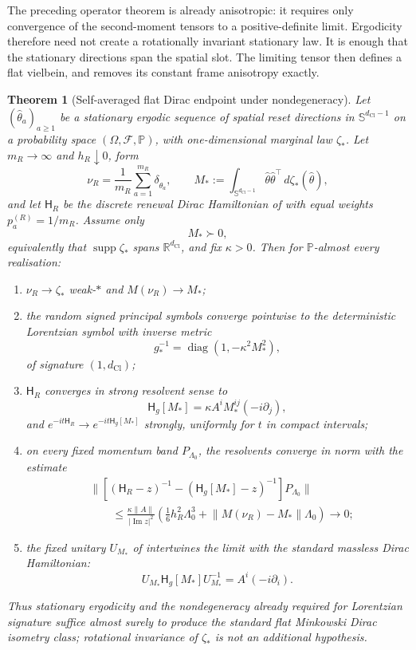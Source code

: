 \documentclass[11pt]{article}
\newtheorem{theorem}{Theorem}[section]
\theoremstyle{definition}
\theoremstyle{remark}
\newcommand{\R}{\mathbb{R}}
\newcommand{\dCl}{d_{\mathrm{Cl}}}
\newcommand{\Sphere}{\mathbb{S}}
\newcommand{\supp}{\operatorname{supp}}
\newcommand{\Ham}{\mathsf{H}}
\newcommand{\norm}[1]{\lVert#1\rVert}
\begin{document}
The preceding operator theorem is already anisotropic: it requires only
convergence of the second-moment tensors to a positive-definite limit.  Ergodicity
therefore need not create a rotationally invariant stationary law.  It is enough
that the stationary directions span the spatial slot.  The limiting tensor then
defines a flat vielbein, and  removes its constant
frame anisotropy exactly.

\begin{theorem}[Self-averaged flat Dirac endpoint under nondegeneracy]
\label{thm:self-averaging}
Let $(\hat\theta_a)_{a\ge1}$ be a stationary ergodic sequence of spatial reset
directions in $\Sphere^{\dCl-1}$ on a probability space
$(\Omega,\mathcal F,\mathbb P)$, with one-dimensional marginal law $\zeta_*$.
Let $m_R\to\infty$ and $h_R\downarrow0$, form
\[
 \nu_R=\frac1{m_R}\sum_{a=1}^{m_R}\delta_{\hat\theta_a},
 \qquad
 M_*:=\int_{\Sphere^{\dCl-1}}
       \hat\theta\hat\theta^\top\,d\zeta_*(\hat\theta),
\]
and let $\Ham_R$ be the discrete renewal Dirac Hamiltonian of
 with equal weights \(p_a^{(R)}=1/m_R\).
Assume only
\[
  M_*\succ0,
\]
equivalently that \(\supp\zeta_*\) spans \(\R^{\dCl}\), and fix
\(\kappa>0\).  Then for \(\mathbb P\)-almost every realisation:
\begin{enumerate}[label=\textup{(\roman*)},leftmargin=2.4em]
\item \(\nu_R\to\zeta_*\) weak-$*$ and \(M(\nu_R)\to M_*\);
\item the random signed principal symbols converge pointwise to the
      deterministic Lorentzian symbol with inverse metric
      \[
        g_*^{-1}=\operatorname{diag}(1,-\kappa^2M_*^2),
      \]
      of signature \((1,\dCl)\);
\item \(\Ham_R\) converges in strong resolvent sense to
      \[
        \Ham_g[M_*]=\kappa A^iM_*^{ij}(-i\partial_j),
      \]
      and \(e^{-it\Ham_R}\to e^{-it\Ham_g[M_*]}\) strongly, uniformly for
      \(t\) in compact intervals;
\item on every fixed momentum band \(P_{\Lambda_0}\), the resolvents converge in
      norm with the estimate
      \[
      \begin{split}
       &\bigl\|
       [(\Ham_R-z)^{-1}-(\Ham_g[M_*]-z)^{-1}]P_{\Lambda_0}
       \bigr\|\\
       &\qquad\le
       \frac{\kappa\norm{A}}{|\operatorname{Im}z|^2}
       \left(
       \frac16h_R^2\Lambda_0^3+
       \norm{M(\nu_R)-M_*}\Lambda_0
       \right)\longrightarrow0;
      \end{split}
      \]
\item the fixed unitary \(U_{M_*}\) of
       intertwines the limit with the standard
      massless Dirac Hamiltonian:
      \[
        U_{M_*}\Ham_g[M_*]U_{M_*}^{-1}
        =A^i(-i\partial_i).
      \]
\end{enumerate}
Thus stationary ergodicity and the nondegeneracy already required for
Lorentzian signature suffice almost surely to produce the standard flat
Minkowski Dirac isometry class; rotational invariance of \(\zeta_*\) is not an
additional hypothesis.
\end{theorem}
\end{document}
